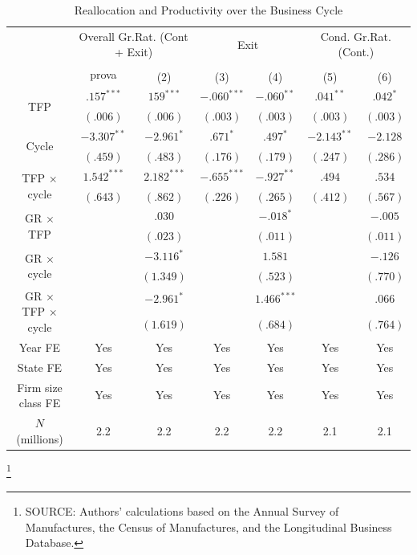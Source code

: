 \documentclass[12pt]{article}
\begin{document}
 \begin{table}[H]
    \centering
    \caption{Reallocation and Productivity over the Business Cycle}
    \begin{tabular}{|c|c c c c c c|}
    \hline & \multicolumn{2}{c|}{Overall Gr.Rat. (Cont + Exit)} & \multicolumn{2}{c|}{Exit} &
    \multicolumn{2}{c|}{Cond. Gr.Rat.(Cont.)} \\
    & \multirow{2}{*}{prova}\\
    \hline & (1) & (2) & (3) & (4) & (5) & (6) \\
     \multirow{2}{*}{TFP} & $.157^{***}$ & $159^{***}$ & $-.060^{***}$ & $-.060^{**}$ & $.041^{**}$ & $.042^{*}$ \\
    & $(.006)$ & $(.006)$ & $(.003)$ & $(.003)$ & $(.003)$ & $(.003)$ \\
     \multirow{2}{*}{Cycle} & $-3.307^{**}$ & $-2.961^{*}$ & $.671^{*}$ & $.497^{*}$ & $-2.143^{**}$ & $-2.128$ \\
    & $(.459)$ & $(.483)$ & $(.176)$ & $(.179)$ & $(.247)$ & $(.286)$ \\
     \multirow{2}{*}{TFP $\times$ cycle} & $1.542^{***}$ & $2.182^{***}$ & $-.655^{***}$ & $-.927^{**}$ & $.494$ & $.534$ \\
    & $(.643)$ & $(.862)$ & $(.226)$ & $(.265)$ & $(.412)$ & $(.567)$ \\
     \multirow{2}{*}{GR $\times$ TFP} & & $.030$ & & $-.018^{*}$ & & $-.005$ \\
    & & $(.023)$ & & $(.011)$ & & $(.011)$ \\
     \multirow{2}{*}{GR $\times$ cycle} & & $-3.116^{*}$ & & $1.581$ & & $-.126$ \\
    & & $(1.349)$ & & $(.523)$ & & $(.770)$ \\
     \multirow{2}{*}{GR $\times$ TFP $\times$ cycle} & & $-2.961^{*}$ & & $1.466^{***}$ & & $.066$ \\
    & & $(1.619)$ & & $(.684)$ & & $(.764)$ \\
    \hline Year FE & Yes & Yes & Yes & Yes & Yes & Yes \\
     State FE & Yes & Yes & Yes & Yes & Yes & Yes \\
     Firm size class FE & Yes & Yes & Yes & Yes & Yes & Yes \\
     $N$ (millions) & 2.2 & 2.2 & 2.2 & 2.2 & 2.1 & 2.1 \\
    \hline
    \end{tabular}
    \footnote{SOURCE: Authors' calculations based on the Annual Survey of Manufactures, the Census of Manufactures, and the Longitudinal Business Database.}

\end{table}
\end{document}
